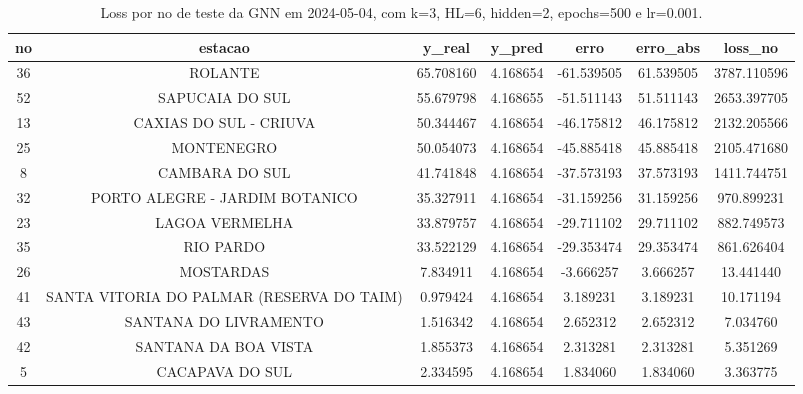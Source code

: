 \begin{table}[h]
\centering
\caption{Loss por no de teste da GNN em 2024-05-04, com k=3, HL=6, hidden=2, epochs=500 e lr=0.001.}
\label{tab:gnn_loss_k3_hl6_h2_e500_d20240504}
\begin{tabular}{ccccccc}
\toprule
no & estacao & y\_real & y\_pred & erro & erro\_abs & loss\_no \\
\midrule
36 & ROLANTE & 65.708160 & 4.168654 & -61.539505 & 61.539505 & 3787.110596 \\
52 & SAPUCAIA DO SUL & 55.679798 & 4.168655 & -51.511143 & 51.511143 & 2653.397705 \\
13 & CAXIAS DO SUL - CRIUVA & 50.344467 & 4.168654 & -46.175812 & 46.175812 & 2132.205566 \\
25 & MONTENEGRO & 50.054073 & 4.168654 & -45.885418 & 45.885418 & 2105.471680 \\
8 & CAMBARA DO SUL & 41.741848 & 4.168654 & -37.573193 & 37.573193 & 1411.744751 \\
32 & PORTO ALEGRE - JARDIM BOTANICO & 35.327911 & 4.168654 & -31.159256 & 31.159256 & 970.899231 \\
23 & LAGOA VERMELHA & 33.879757 & 4.168654 & -29.711102 & 29.711102 & 882.749573 \\
35 & RIO PARDO & 33.522129 & 4.168654 & -29.353474 & 29.353474 & 861.626404 \\
26 & MOSTARDAS & 7.834911 & 4.168654 & -3.666257 & 3.666257 & 13.441440 \\
41 & SANTA VITORIA DO PALMAR (RESERVA DO TAIM) & 0.979424 & 4.168654 & 3.189231 & 3.189231 & 10.171194 \\
43 & SANTANA DO LIVRAMENTO & 1.516342 & 4.168654 & 2.652312 & 2.652312 & 7.034760 \\
42 & SANTANA DA BOA VISTA & 1.855373 & 4.168654 & 2.313281 & 2.313281 & 5.351269 \\
5 & CACAPAVA DO SUL & 2.334595 & 4.168654 & 1.834060 & 1.834060 & 3.363775 \\
\bottomrule
\end{tabular}
\end{table}
